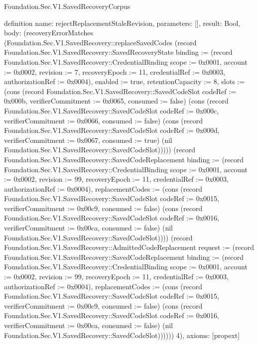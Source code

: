\begin{lexlean}{Foundation.Sec.V1.SavedRecoveryCorpus}
\begin{semanticmodule}
definition{
  name: rejectReplacementStaleRevision,
  parameters: [],
  result: Bool,
  body: (recoveryErrorMatches (Foundation.Sec.V1.SavedRecovery::replaceSavedCodes (record Foundation.Sec.V1.SavedRecovery::SavedRecoveryState {binding := (record Foundation.Sec.V1.SavedRecovery::CredentialBinding {scope := 0x0001, account := 0x0002, revision := 7, recoveryEpoch := 11, credentialRef := 0x0003, authorizationRef := 0x0004}), enabled := true, retentionCapacity := 8, slots := (cons (record Foundation.Sec.V1.SavedRecovery::SavedCodeSlot {codeRef := 0x000b, verifierCommitment := 0x0065, consumed := false}) (cons (record Foundation.Sec.V1.SavedRecovery::SavedCodeSlot {codeRef := 0x000c, verifierCommitment := 0x0066, consumed := false}) (cons (record Foundation.Sec.V1.SavedRecovery::SavedCodeSlot {codeRef := 0x000d, verifierCommitment := 0x0067, consumed := true}) (nil Foundation.Sec.V1.SavedRecovery::SavedCodeSlot))))}) (record Foundation.Sec.V1.SavedRecovery::SavedCodeReplacement {binding := (record Foundation.Sec.V1.SavedRecovery::CredentialBinding {scope := 0x0001, account := 0x0002, revision := 99, recoveryEpoch := 11, credentialRef := 0x0003, authorizationRef := 0x0004}), replacementCodes := (cons (record Foundation.Sec.V1.SavedRecovery::SavedCodeSlot {codeRef := 0x0015, verifierCommitment := 0x00c9, consumed := false}) (cons (record Foundation.Sec.V1.SavedRecovery::SavedCodeSlot {codeRef := 0x0016, verifierCommitment := 0x00ca, consumed := false}) (nil Foundation.Sec.V1.SavedRecovery::SavedCodeSlot)))}) (record Foundation.Sec.V1.SavedRecovery::AdmittedCodeReplacement {request := (record Foundation.Sec.V1.SavedRecovery::SavedCodeReplacement {binding := (record Foundation.Sec.V1.SavedRecovery::CredentialBinding {scope := 0x0001, account := 0x0002, revision := 99, recoveryEpoch := 11, credentialRef := 0x0003, authorizationRef := 0x0004}), replacementCodes := (cons (record Foundation.Sec.V1.SavedRecovery::SavedCodeSlot {codeRef := 0x0015, verifierCommitment := 0x00c9, consumed := false}) (cons (record Foundation.Sec.V1.SavedRecovery::SavedCodeSlot {codeRef := 0x0016, verifierCommitment := 0x00ca, consumed := false}) (nil Foundation.Sec.V1.SavedRecovery::SavedCodeSlot)))})})) 4),
  axioms: [propext]
}


\end{semanticmodule}
\end{lexlean}
